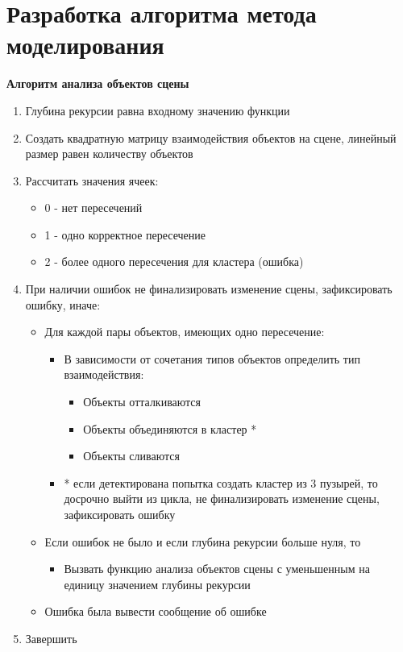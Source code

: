 \section{Разработка алгоритма метода моделирования}
\textbf{Алгоритм анализа объектов сцены}
\begin{enumerate}[label={\arabic*)}]
	\item Глубина рекурсии равна входному значению функции
	\item Создать квадратную матрицу взаимодействия объектов на сцене, линейный размер равен количеству объектов
	\item Рассчитать значения ячеек:
	\begin{itemize}
		\item 0 - нет пересечений
		\item 1 - одно корректное пересечение
		\item 2 - более одного пересечения для кластера (ошибка)
	\end{itemize}
	\item При наличии ошибок не финализировать изменение сцены, зафиксировать ошибку, иначе:
	\begin{itemize}
		\item Для каждой пары объектов, имеющих одно пересечение:
		\begin{itemize}
			\item В зависимости от сочетания типов объектов определить тип взаимодействия:
			\begin{itemize} [label=-]
				\item Объекты отталкиваются
				\item Объекты объединяются в кластер *
				\item Объекты сливаются
			\end{itemize}
			\item * если детектирована попытка создать кластер из 3 пузырей, то досрочно выйти из цикла, не финализировать изменение сцены, зафиксировать ошибку
		\end{itemize}
		\item Если ошибок не было и если глубина рекурсии больше нуля, то
		\begin{itemize}
			\item Вызвать функцию анализа объектов сцены с уменьшенным на единицу значением глубины рекурсии
		\end{itemize}
		\item Ошибка была вывести сообщение об ошибке
	\end{itemize}
	\item Завершить
\end{enumerate}


